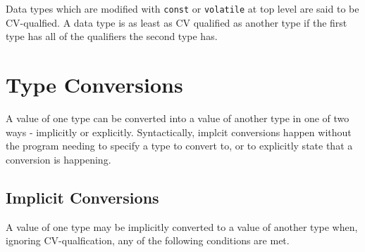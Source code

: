 \documentclass[letterpaper,12pt]{book}
\begin{document}
Data types which are modified with \texttt{const} or \texttt{volatile} at top level are said to be CV-qualfied. A data type is as least as CV qualified as another type if the first type has all of the qualifiers the second type has.

\section{Type Conversions}

A value of one type can be converted into a value of another type in one of two ways - implicitly or explicitly. Syntactically, implcit conversions happen without the program needing to specify a type to convert to, or to explicitly state that a conversion is happening.

\subsection{Implicit Conversions}\label{subsection:Implicit Conversions}

A value of one type may be implicitly converted to a value of another type when, ignoring CV-qualfication, any of the following conditions are met.
\end{document}
